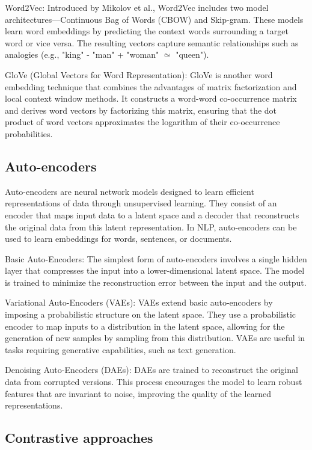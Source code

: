 Word2Vec: Introduced by Mikolov et al., Word2Vec includes two model architectures—Continuous Bag of Words (CBOW) and Skip-gram. These models learn word embeddings by predicting the context words surrounding a target word or vice versa. The resulting vectors capture semantic relationships such as analogies (e.g., "king" - "man" + "woman" $\simeq$ "queen").

GloVe (Global Vectors for Word Representation): GloVe is another word embedding technique that combines the advantages of matrix factorization and local context window methods. It constructs a word-word co-occurrence matrix and derives word vectors by factorizing this matrix, ensuring that the dot product of word vectors approximates the logarithm of their co-occurrence probabilities.

\subsection{Auto-encoders}
Auto-encoders are neural network models designed to learn efficient representations of data through unsupervised learning. They consist of an encoder that maps input data to a latent space and a decoder that reconstructs the original data from this latent representation. In NLP, auto-encoders can be used to learn embeddings for words, sentences, or documents.

Basic Auto-Encoders: The simplest form of auto-encoders involves a single hidden layer that compresses the input into a lower-dimensional latent space. The model is trained to minimize the reconstruction error between the input and the output.

Variational Auto-Encoders (VAEs): VAEs extend basic auto-encoders by imposing a probabilistic structure on the latent space. They use a probabilistic encoder to map inputs to a distribution in the latent space, allowing for the generation of new samples by sampling from this distribution. VAEs are useful in tasks requiring generative capabilities, such as text generation.

Denoising Auto-Encoders (DAEs): DAEs are trained to reconstruct the original data from corrupted versions. This process encourages the model to learn robust features that are invariant to noise, improving the quality of the learned representations.

\subsection{Contrastive approaches}

